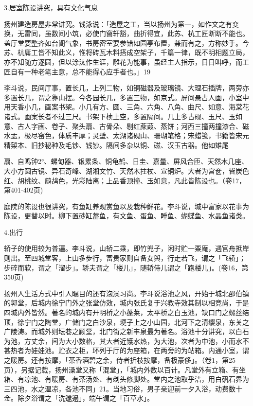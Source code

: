 3.居室陈设讲究，具有文化气息

扬州建造房屋非常讲究。钱泳说：「造屋之工，当以扬州为第一，如作文之有变换，无雷同，虽数间小筑，必使门窗轩豁，曲折得宜，此苏、杭工匠断断不能也。盖厅堂要整齐如台阁气象，书房密室要参错如园亭布置，兼而有之，方称妙手。今苏、杭庸工皆不知此义，惟将砖瓦木料搭成空架子，千篇一律，既不明相题立局，亦不知随方逐圆，但以涂汰作生涯，雕花为能事，虽经主人指示，日日叫呼，而工匠自有一种老笔主意，总不能得心应手者也。」19

李斗说，民间厅事，置长几，上列二物，如铜磁器及玻璃镜、大理石插牌，两旁亦多置长几，谓之靠山摆。今各园长几，多置三物，如京式。屏间悬古人画，小室中用天香小几，画案书架。小几有方、圆、三角、六角、八角、曲尺、如意、海棠花诸式。画案长者不过三尺。书架下椟上空，多置隔间。几上多古砚、玉尺、玉如意、古人字画、卷子、聚头扇、古骨朵、剔红蔗葭、蒸饼；河西三撞两撞漆合、磁水盂，极尽窑色，体质丰厚；灵壁、太湖诸砚山、珊瑚笔格；宋蜡笺，书籍皆宋元精椠本、旧抄秘种及毛钞、钱钞。隔间多杂以铜、磁、汉玉古器。他如雉尾

\vfill
\begin{BookNotes}
\end{BookNotes}

\noindent 扇、自鸣钟2°、螺甸器、银累条、铜龟鹤、日圭、嘉量、屏风合匝、天然木几座、大小方圆古镜、异石奇峰、湖湘文竹、天然木拄杖、宣铜炉。大者为宫奁，皆炭色红、胡桃纹、鹧鸪色，光彩陆离；上品香顶撞、玉如意，凡此皆陈设也。（卷17，第401-402页)

庭院的陈设也很讲究，有鱼缸养观赏鱼以及栽种鲜花。李斗说，城中富家以花事为陈设，更替以时。柳下置砂缸蓄鱼，有文鱼、蛋鱼、睡鱼、蝴蝶鱼、水晶鱼诸类。

4.出行

轿子的使用较为普遍。李斗说，山轿二乘，即竹兜子，闲时贮一粟庵，遇官舟抵岸则出。至四城堂客，上山多步行，富贵家则自备女舆，行走若飞，谓之「飞轿」；步碎而软，谓之「溜步」。轿夫谓之「楼儿」，随轿侍儿谓之「跑楼儿」。(卷16，第350页)

扬州人生活方式中引人瞩目的还有泡澡习尚。李斗说浴池之风，开始于城北邵伯镇的郭堂，后城内徐宁门外之张堂仿效，城内张氏复于兴教寺效其制以相竞尚，于是四城内外皆然。著名的城内有开明桥之小蓬莱，太平桥之白玉池，缺口门之螺丝结顶，徐宁门之陶堂，广储门之白沙泉，埂子上之小山园，北河下之清缨泉，东关之广陵涛。而城外则坛巷之顾堂，北门街之新丰泉最为著名。浴池十分讲究，以白石为池，方丈余，间为大小数格，其大者近镬水热，为大池，次者为中池，小而水不甚热者为娃娃池。贮衣之柜，环列于厅的为座箱，在两旁的为站箱。内通小室，谓之暖房。还有按摩，「茶香酒碧之余，侍者折枝按摩，备极豪侈」。（卷1，第25页），另据记载，扬州澡堂又称「混堂」，「城内外数以百计。凡堂外有立箱、有坐箱、有凉池、有暖房、有茶汤处、有剃头修脚处。堂内之池取乎洁，用白矾石界为三四池，水之温凉，各池不同」21。当地习俗，男子亲迎前一夕入浴，动费数十金。除夕浴谓之「洗邋遢」，端午谓之「百草水」。

